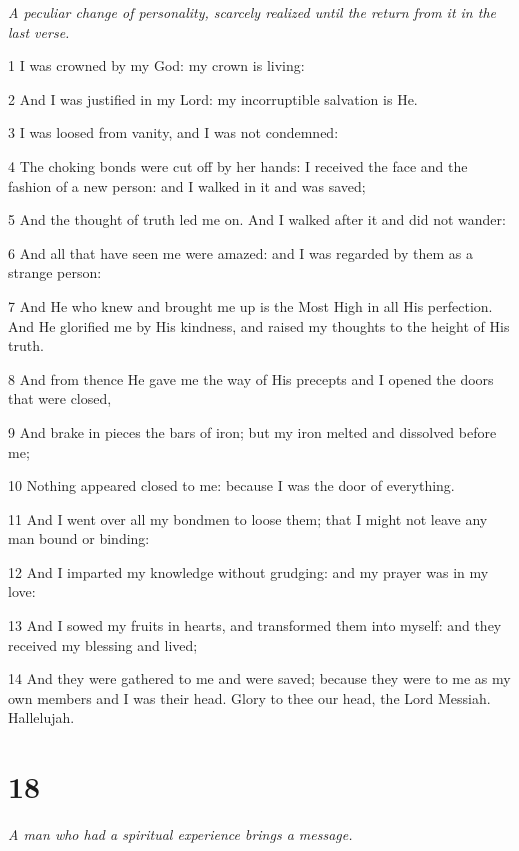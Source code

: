 \par \textit{A peculiar change of personality, scarcely realized until the return from it in the last verse.}

\par 1 I was crowned by my God: my crown is living:
\par 2 And I was justified in my Lord: my incorruptible salvation is He.
\par 3 I was loosed from vanity, and I was not condemned:
\par 4 The choking bonds were cut off by her hands: I received the face and the fashion of a new person: and I walked in it and was saved;
\par 5 And the thought of truth led me on. And I walked after it and did not wander:
\par 6 And all that have seen me were amazed: and I was regarded by them as a strange person:
\par 7 And He who knew and brought me up is the Most High in all His perfection. And He glorified me by His kindness, and raised my thoughts to the height of His truth.
\par 8 And from thence He gave me the way of His precepts and I opened the doors that were closed,
\par 9 And brake in pieces the bars of iron; but my iron melted and dissolved before me;
\par 10 Nothing appeared closed to me: because I was the door of everything.
\par 11 And I went over all my bondmen to loose them; that I might not leave any man bound or binding:
\par 12 And I imparted my knowledge without grudging: and my prayer was in my love:
\par 13 And I sowed my fruits in hearts, and transformed them into myself: and they received my blessing and lived;
\par 14 And they were gathered to me and were saved; because they were to me as my own members and I was their head. Glory to thee our head, the Lord Messiah. Hallelujah.

\chapter{18}

\par \textit{A man who had a spiritual experience brings a message.}

